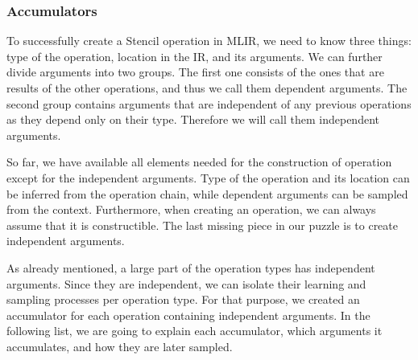 \documentclass[sigplan,\review anonymous]{acmart}
\begin{document}
\subsubsection{Accumulators}
To successfully create a Stencil operation in MLIR, we need to know three
things: type of the operation, location in the IR, and its arguments. We
can further divide arguments into two groups. The first one consists of the
ones that are results of the other operations, and thus we call them dependent
arguments. The second group contains arguments that are independent of any
previous operations as they depend only on their type. Therefore we will call
them independent arguments.

So far, we have available all elements needed for the construction of
operation except for the independent arguments. Type of the operation
and its location can be inferred from the operation chain, while dependent
arguments can be sampled from the context. Furthermore, when creating an
operation, we can always assume that it is constructible. The last missing
piece in our puzzle is to create independent arguments.

As already mentioned, a large part of the operation types has independent
arguments. Since they are independent, we can isolate their learning and
sampling processes per operation type. For that purpose, we created an
accumulator for each operation containing independent arguments. In the
following list, we are going to explain each accumulator, which arguments
it accumulates, and how they are later sampled.
\end{document}
